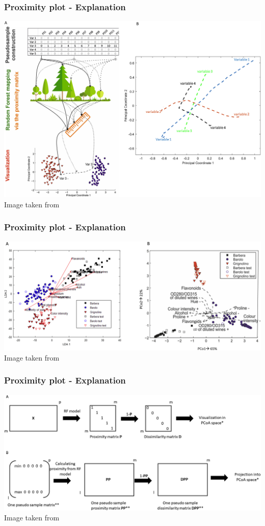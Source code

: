 \documentclass[compress]{beamer}
\begin{document}
\begin{frame}
\frametitle{Proximity plot - Explanation}
\begin{center}
\includegraphics[width=0.8\linewidth]{Pic/Prox_explanation.jpg}\\
Image taken from \cite{blanchet2020constructing}
\end{center}
\end{frame}

\begin{frame}
\begin{center}
\frametitle{Proximity plot - Explanation}
\includegraphics[width=0.8\linewidth]{Pic/Prox_explanation_3.jpg}\\
Image taken from \cite{blanchet2020constructing}
\end{center}
\end{frame}

\begin{frame}
\begin{center}
\frametitle{Proximity plot - Explanation}
\includegraphics[width=0.8\linewidth]{Pic/Prox_explanation_2.jpg}\\
Image taken from \cite{blanchet2020constructing}
\end{center}
\end{frame}
\end{document}
